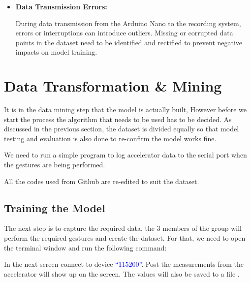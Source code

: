 \begin{itemize}
    Each user may exhibit unique movement patterns or unintentional variations in how gestures are performed. Identifying and addressing user-specific outliers is crucial for creating a model that generalizes well across different individuals within the user group.
    
    \item \textbf{Data Transmission Errors:}
    
    During data transmission from the Arduino Nano to the recording system, errors or interruptions can introduce outliers. Missing or corrupted data points in the dataset need to be identified and rectified to prevent negative impacts on model training.
    
\end{itemize}


\section{Data Transformation \& Mining}
It is in the data mining step that the model is actually built, However before we start the process the algorithm that needs to be used has to be decided. As discussed in the previous section, the dataset is divided equally so that model testing and evaluation is also done to re-confirm the model works fine.

We need to run a simple program to log accelerator data to the serial port when the gestures are being performed. \cite{Warden:2020}


All the codes used from Github are re-edited to suit the dataset.

\subsection{Training the Model}

The next step is to capture the required data, the 3 members of the group will perform the required gestures and create the dataset. For that, we need to open the terminal window and run the following command:

\medskip


\medskip

In the next screen connect to device \textcolor{blue}{``115200''}. Post the measurements from the accelerator will show up on the screen. The values will also be saved to a file . \cite{Warden:2020}

